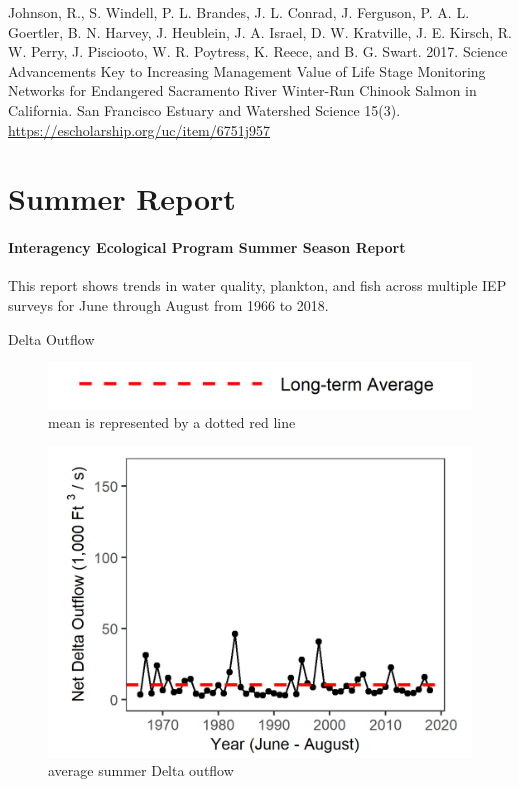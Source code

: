 \documentclass[
]{book}
\begin{document}
\begin{disclaimer}
Johnson, R., S. Windell, P. L. Brandes, J. L. Conrad, J. Ferguson, P. A.
L. Goertler, B. N. Harvey, J. Heublein, J. A. Israel, D. W. Kratville,
J. E. Kirsch, R. W. Perry, J. Pisciooto, W. R. Poytress, K. Reece, and
B. G. Swart. 2017. Science Advancements Key to Increasing Management
Value of Life Stage Monitoring Networks for Endangered Sacramento River
Winter-Run Chinook Salmon in California. San Francisco Estuary and
Watershed Science 15(3). \url{https://escholarship.org/uc/item/6751j957}
\end{disclaimer}

\hypertarget{Summer}{%
\chapter{Summer Report}\label{Summer}}

\hypertarget{interagency-ecological-program-summer-season-report}{%
\subsubsection{Interagency Ecological Program Summer Season Report}\label{interagency-ecological-program-summer-season-report}}

This report shows trends in water quality, plankton, and fish across multiple IEP
surveys for June through August from 1966 to 2018.

Delta Outflow

\begin{figure}
\includegraphics[width=15.25in]{figures/mline} \caption{mean is represented by a dotted red line}\label{fig:unnamed-chunk-47}
\end{figure}

\begin{figure}
\includegraphics[width=15.25in]{figures/summer_outflow_update} \caption{average summer Delta outflow}\label{fig:unnamed-chunk-48}
\end{figure}
\end{document}

